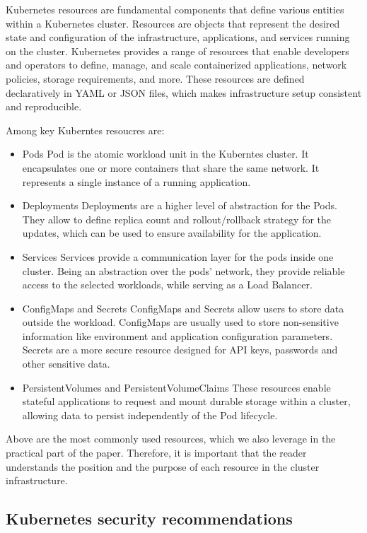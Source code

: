 Kubernetes resources are fundamental components that define various entities within a Kubernetes cluster. Resources are objects that represent the desired state and configuration of the infrastructure, applications, and services running on the cluster. Kubernetes provides a range of resources that enable developers and operators to define, manage, and scale containerized applications, network policies, storage requirements, and more. These resources are defined declaratively in YAML or JSON files, which makes infrastructure setup consistent and reproducible.

Among key Kuberntes resoucres are:
\begin{itemize}
    \item Pods
        Pod is the atomic workload unit in the Kuberntes cluster. It encapsulates one or more containers that share the same network. It represents a single instance of a running application.
    \item Deployments
        Deployments are a higher level of abstraction for the Pods. They allow to define replica count and rollout/rollback strategy for the updates, which can be used to ensure availability for the application.
    \item Services
        Services provide a communication layer for the pods inside one cluster. Being an abstraction over the pods' network, they provide reliable access to the selected workloads, while serving as a Load Balancer. 
    \item ConfigMaps and Secrets
        ConfigMaps and Secrets allow users to store data outside the workload. ConfigMaps are usually used to store non-sensitive information like environment and application configuration parameters. Secrets are a more secure resource designed for API keys, passwords and other sensitive data.
    \item PersistentVolumes and PersistentVolumeClaims
        These resources enable stateful applications to request and mount durable storage within a cluster, allowing data to persist independently of the Pod lifecycle.
\end{itemize}

Above are the most commonly used resources, which we also leverage in the practical part of the paper. Therefore, it is important that the reader understands the position and the purpose of each resource in the cluster infrastructure.

\subsection{Kubernetes security recommendations}

